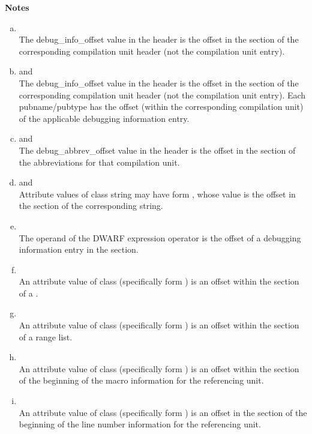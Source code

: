\clearpage
\begin{center}
   \textbf{Notes}
\end{center}
\begin{enumerate}[(a)]  
\item  \dotdebugaranges{}  \\
The debug\_info\_offset value in
the header is
the offset in the \dotdebuginfo{} section of the
corresponding compilation unit header (not the compilation
unit entry).

\item \dotdebugpubnames{} and \dotdebugpubtypes{} \\
The debug\_info\_offset value in the header is the offset in the
\dotdebuginfo{} section of the 
corresponding compilation unit header (not
the compilation unit entry). Each pubname/pubtype has the offset (within
the corresponding compilation unit) of the applicable debugging
information entry.

\item \dotdebuginfo{} and \dotdebugtypes{} \\
The debug\_abbrev\_offset value in the header is the offset in the
\dotdebugabbrev{} 
section of the abbreviations for that compilation unit.

\item  \dotdebuginfo{} and \dotdebugtypes{} \\
Attribute values of class string may have form 
\DWFORMstrp, whose
value is the offset in the \dotdebugstr{}
section of the corresponding string.

\item \dotdebugloc{} \\
The operand of the \DWOPcallref{} 
DWARF expression operator is the
offset of a debugging information entry in the 
\dotdebuginfo{} section.

\item \dotdebuginfo{} \\
An attribute value of class  
(specifically form
\DWFORMsecoffset) 
is an offset within the \dotdebugloc{} 
section of a
.

\item \dotdebuginfo{} \\
An attribute value of class  
(specifically form
\DWFORMsecoffset) 
is an offset within the \dotdebugranges{} section of
a range list.

\item \dotdebuginfo{} \\
An attribute value of class 
 (specifically form
\DWFORMsecoffset) is an 
offset within the 
\dotdebugmacinfo{} section
of the beginning of the macro information for the referencing unit.

\item \dotdebuginfo{} \\
An attribute value of class 
 (specifically form
\DWFORMsecoffset) 
is an offset in the 
\dotdebugline{} section of the
beginning of the line number information for the referencing unit.
\end{enumerate}
